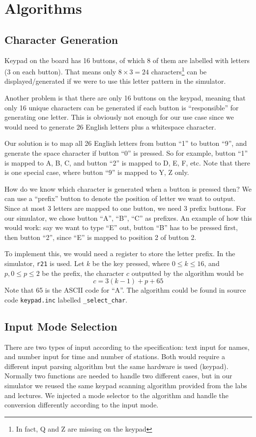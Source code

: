 \documentclass[a4paper,12pt]{article}
\begin{document}
\section{Algorithms}
\subsection{Character Generation}
Keypad on the board has 16 buttons, of which 8 of them are labelled with letters (3 on each button). That means only $8 \times 3 = 24$ characters\footnote{In fact, Q and Z are missing on the keypad} can be displayed/generated if we were to use this letter pattern in the simulator.

Another problem is that there are only 16 buttons on the keypad, meaning that only 16 unique characters can be generated if each button is ``responsible'' for generating one letter. This is obviously not enough for our use case since we would need to generate 26 English letters plus a whitespace character.

Our solution is to map all 26 English letters from button ``1'' to button ``9'', and generate the space character if button ``0'' is pressed. So for example, button ``1'' is mapped to A, B, C, and button ``2'' is mapped to D, E, F, etc. Note that there is one special case, where button ``9'' is mapped to Y, Z only.

How do we know which character is generated when a button is pressed then? We can use a ``prefix'' button to denote the position of letter we want to output. Since at most 3 letters are mapped to one button, we need 3 prefix buttons. For our simulator, we chose button ``A'', ``B'', ``C'' as prefixes. An example of how this would work: say we want to type ``E'' out, button ``B'' has to be pressed first, then button ``2'', since ``E'' is mapped to position 2 of button 2.

To implement this, we would need a register to store the letter prefix. In the simulator, \texttt{r21} is used. Let $k$ be the key pressed, where $0 \leq k \leq 16$, and $p, 0 \leq p \leq 2$ be the prefix, the character $c$ outputted by the algorithm would be
\[
c = 3(k - 1) + p + 65
\]
Note that 65 is the ASCII code for ``A''. The algorithm could be found in source code \texttt{keypad.inc} labelled \texttt{\_select\_char}.

\subsection{Input Mode Selection}
There are two types of input according to the specification: text input for names, and number input for time and number of stations. Both would require a different input parsing algorithm but the same hardware is used (keypad). Normally two functions are needed to handle two different cases, but in our simulator we reused the same keypad scanning algorithm provided from the labs and lectures. We injected a mode selector to the algorithm and handle the conversion differently according to the input mode.
\end{document}
